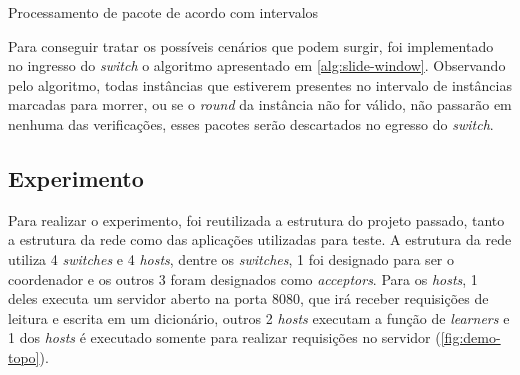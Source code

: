 \documentclass[
    12pt,
    openright, 
    oneside,
    a4paper,
    french,
    english,
    brazil
    ]{facom-ufu-abntex2}
\theoremstyle{definition}
\begin{document}
\begin{algorithm}[H]
\label{alg:slide-window}
\caption{Processamento de pacote de acordo com intervalos}
\SetAlgoLined
{}
\end{algorithm}

Para conseguir tratar os possíveis cenários que podem surgir, foi implementado no ingresso do \emph{switch} o algoritmo
apresentado em \ref{alg:slide-window}. Observando pelo algoritmo, todas instâncias que estiverem presentes no intervalo de 
instâncias marcadas para morrer, ou se o \emph{round} da instância não for válido, não passarão em nenhuma das verificações, esses 
pacotes serão descartados no egresso do \emph{switch}.


\subsection{Experimento}
Para realizar o experimento, foi reutilizada a estrutura do projeto passado, tanto a estrutura da rede como das 
aplicações utilizadas para teste. A estrutura da rede utiliza 4 \emph{switches} e 4 \emph{hosts},
dentre os \emph{switches}, 1 foi designado para ser o coordenador e os outros 3 foram designados como \emph{acceptors}.
Para os \emph{hosts}, 1 deles executa um servidor aberto na porta 8080, que irá receber requisições de leitura
e escrita em um dicionário, outros 2 \emph{hosts} executam a função de \emph{learners} e 1 dos \emph{hosts} é executado
somente para realizar requisições no servidor (\ref{fig:demo-topo}).
\end{document}
